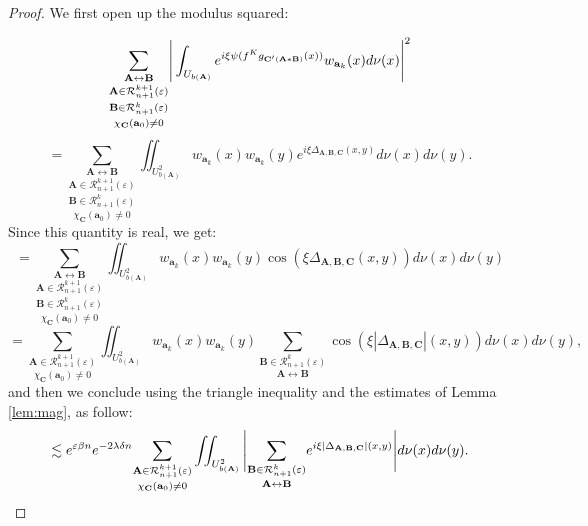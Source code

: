 \documentclass[a4paper]{article}
\theoremstyle{definition}
\begin{document}
\begin{proof}

We first open up the modulus squared:

$$  \underset{\chi_\mathbf{C}(\mathbf{a}_0) \neq 0}{\underset{\mathbf{B} \in \mathcal{R}_{n+1}^k(\varepsilon)}{\underset{\mathbf{A} \in \mathcal{R}_{n+1}^{k+1}(\varepsilon) }{\sum_{\mathbf{A} \leftrightarrow \mathbf{B}}}}}  \Bigg{|} \int_{U_{b(\mathbf{A})}}  e^{i \xi \psi( f^K g_{\mathbf{C}'(\mathbf{A} * \mathbf{B})}(x))} w_{\mathbf{a}_k}(x) d\nu(x) \Bigg{|}^2  $$ $$= \underset{\chi_\mathbf{C}(\mathbf{a}_0) \neq 0}{\underset{\mathbf{B} \in \mathcal{R}_{n+1}^k(\varepsilon)}{\underset{\mathbf{A} \in \mathcal{R}_{n+1}^{k+1}(\varepsilon) }{\sum_{\mathbf{A} \leftrightarrow \mathbf{B}}}}} \iint_{U_{b(\mathbf{A})}^2} w_{\mathbf{a}_k}(x) w_{\mathbf{a}_k}(y) e^{i \xi \Delta_{\mathbf{A},\mathbf{B},\mathbf{C}}(x,y)  }  d\nu(x) d\nu(y).  $$
Since this quantity is real, we get:
$$ = \underset{\chi_\mathbf{C}(\mathbf{a}_0) \neq 0}{\underset{\mathbf{B} \in \mathcal{R}_{n+1}^k(\varepsilon)}{\underset{\mathbf{A} \in \mathcal{R}_{n+1}^{k+1}(\varepsilon) }{\sum_{\mathbf{A} \leftrightarrow \mathbf{B}}}}} \iint_{U_{b(\mathbf{A})}^2} w_{\mathbf{a}_k}(x) w_{\mathbf{a}_k}(y) \cos({ \xi \Delta_{\mathbf{A},\mathbf{B},\mathbf{C}}(x,y)  })  d\nu(x) d\nu(y) $$
$$ = \underset{\chi_\mathbf{C}(\mathbf{a}_0) \neq 0}{\sum_{\mathbf{A} \in \mathcal{R}_{n+1}^{k+1}(\varepsilon)}} \iint_{U_{b(\mathbf{A})}^2 }  w_{\mathbf{a}_k}(x) w_{\mathbf{a}_k}(y) \underset{\mathbf{A} \leftrightarrow \mathbf{B}}{\sum_{\mathbf{B} \in \mathcal{R}_{n+1}^k(\varepsilon)}}  \cos\left( \xi  |\Delta_{\mathbf{A},\mathbf{B},\mathbf{C}}|(x,y) \right) d\nu(x) d\nu(y),$$
and then we conclude using the triangle inequality and the estimates of Lemma \ref{lem:mag}, as follow:
$$ \lesssim e^{\varepsilon \beta n } e^{- 2 \lambda \delta n}  \underset{\chi_\mathbf{C}(\mathbf{a}_0) \neq 0}{\sum_{\mathbf{A} \in \mathcal{R}_{n+1}^{k+1}(\varepsilon)}} \iint_{U_{b(\mathbf{A})}^2 }  \Bigg{|} \underset{\mathbf{A} \leftrightarrow \mathbf{B}}{\sum_{\mathbf{B} \in \mathcal{R}_{n+1}^k(\varepsilon)}} e^{i \xi \left|\Delta_{\mathbf{A},\mathbf{B},\mathbf{C}}\right|(x,y) } \Bigg| d\nu(x) d\nu(y) . $$

\end{proof}
\end{document}
